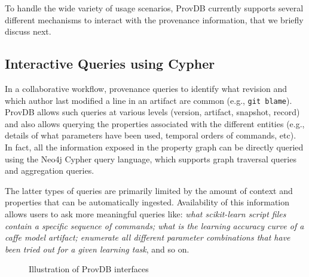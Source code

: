 \documentclass[11pt]{article}
\newcommand{\provdb}{{\sc ProvDB}\xspace}
\begin{document}
To handle the wide variety of usage scenarios, \provdb currently supports several different mechanisms to interact with the provenance information, that we briefly discuss next. 
\subsection{Interactive Queries using Cypher}
In a collaborative workflow, provenance queries to identify what revision and which author last modified a line in an artifact are common (e.g., {\tt git blame}). \provdb allows such queries at various levels (version, artifact, snapshot, record) and also allows querying the properties associated with the different entities (e.g., details of what parameters have been used, temporal orders of commands, etc). In fact, all the information exposed in the property graph can be directly queried using the Neo4j Cypher query language, which supports graph traversal queries and aggregation queries.

The latter types of queries are primarily limited by the amount of context and properties that can be automatically ingested.
Availability of this information allows users
to ask more meaningful queries like: {\em what scikit-learn script files contain a specific sequence of commands; what is the learning accuracy curve of a caffe model
    artifact; enumerate all different parameter combinations that have been tried out for a given learning task}, and so on.

\begin{figure}[t!]
\vspace{-10pt}
\caption{Illustration of \provdb interfaces}
\vspace{-10pt}
\label{fig:showcase}
\end{figure}
\end{document}

